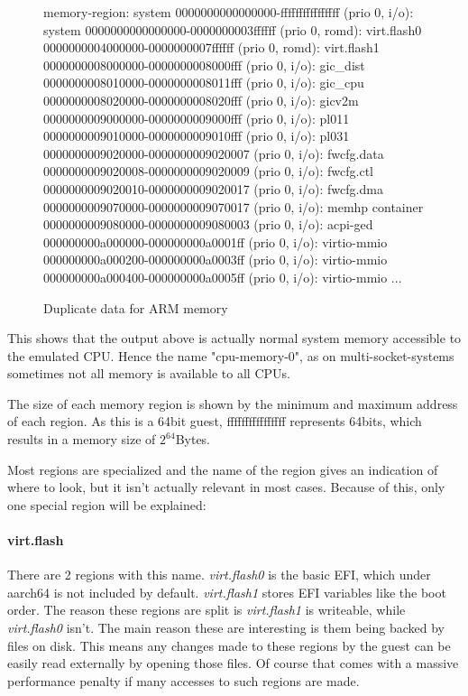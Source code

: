 \begin{figure}[H]
\begin{ffcode}
    memory-region: system
    0000000000000000-ffffffffffffffff (prio 0, i/o): system
      0000000000000000-0000000003ffffff (prio 0, romd): virt.flash0
      0000000004000000-0000000007ffffff (prio 0, romd): virt.flash1
      0000000008000000-0000000008000fff (prio 0, i/o): gic_dist
      0000000008010000-0000000008011fff (prio 0, i/o): gic_cpu
      0000000008020000-0000000008020fff (prio 0, i/o): gicv2m
      0000000009000000-0000000009000fff (prio 0, i/o): pl011
      0000000009010000-0000000009010fff (prio 0, i/o): pl031
      0000000009020000-0000000009020007 (prio 0, i/o): fwcfg.data
      0000000009020008-0000000009020009 (prio 0, i/o): fwcfg.ctl
      0000000009020010-0000000009020017 (prio 0, i/o): fwcfg.dma
      0000000009070000-0000000009070017 (prio 0, i/o): memhp container
      0000000009080000-0000000009080003 (prio 0, i/o): acpi-ged
      000000000a000000-000000000a0001ff (prio 0, i/o): virtio-mmio
      000000000a000200-000000000a0003ff (prio 0, i/o): virtio-mmio
      000000000a000400-000000000a0005ff (prio 0, i/o): virtio-mmio
      ...
\end{ffcode}
\caption{Duplicate data for ARM memory}
\label{fig:mem-duplicate}
\end{figure}

This shows that the output above is actually normal system memory accessible to the emulated CPU.
Hence the name "cpu-memory-0", as on multi-socket-systems sometimes not all memory is available to all CPUs.

The size of each memory region is shown by the minimum and maximum address of each region.
As this is a 64bit guest, ffffffffffffffff represents 64bits, which results in a memory size of $2^{64}$Bytes.

Most regions are specialized and the name of the region gives an indication of where to look,
but it isn't actually relevant in most cases.
Because of this, only one special region will be explained:

\paragraph{virt.flash}
There are 2 regions with this name. \emph{virt.flash0} is the basic EFI, which under aarch64 is not included by default.
\emph{virt.flash1} stores EFI variables like the boot order.
The reason these regions are split is \emph{virt.flash1} is writeable, while \emph{virt.flash0} isn't.
The main reason these are interesting is them being backed by files on disk.
This means any changes made to these regions by the guest can be easily read externally by opening those files.
Of course that comes with a massive performance penalty if many accesses to such regions are made.

